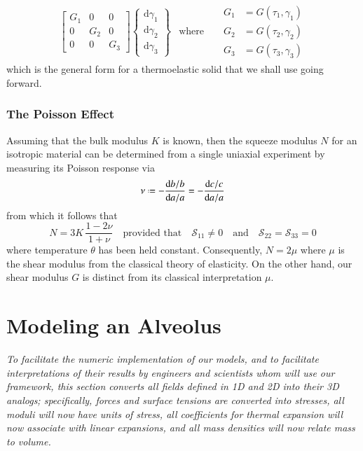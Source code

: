 \begin{subequations}
\begin{align}
\begin{bmatrix}
    G_1 & 0 & 0 \\ 0 & G_2 & 0 \\ 0 & 0 & G_3
    \end{bmatrix} \left\{ \begin{matrix}
    \mathrm{d} \gamma_1 \\ \mathrm{d} \gamma_2 \\ \mathrm{d} \gamma_3
    \end{matrix} \right\} & 
    \text{where} & & \begin{aligned}
    G_1 & = G ( \tau_1 , \gamma_1 ) \\
    G_2 & = G ( \tau_2 , \gamma_2 ) \\
    G_3 & = G ( \tau_3 , \gamma_3 )
    \end{aligned}
    \label{HelmholtzODEsShear}
    \end{align}
\end{subequations}
which is the general form for a thermo\-elastic solid that we shall use going forward.

\subsubsection{The Poisson Effect}

Assuming that the bulk modulus $K$ is known, then the squeeze modulus $N$ for an isotropic material can be determined from a single uniaxial experiment by measuring its Poisson response via
\begin{displaymath}
\nu \defeq - \frac{\mathrm{d}b / b}{\mathrm{d}a / a} = 
- \frac{\mathrm{d} c / c}{\mathrm{d}a / a}
\end{displaymath}
from which it follows that
\begin{displaymath}
N = 3K \, \frac{1 - 2\nu}{1 + \nu}
\quad \text{provided that} \quad
\mathcal{S}_{11} \neq 0 
\quad \text{and} \quad
\mathcal{S}_{22} = \mathcal{S}_{33} = 0 
\end{displaymath}
where temperature $\theta$ has been held constant.  Consequently, $N = 2\mu$ where $\mu$ is the shear modulus from the classical theory of elasticity.  On the other hand, our shear modulus $G$ is distinct from its classical interpretation $\mu$.

\section{Modeling an Alveolus}
\label{secAlveolus}

\textit{To facilitate the numeric implementation of our models, and to facilitate interpretations of their results by engineers and scientists whom will use our framework, this section converts all fields defined in 1D and 2D into their 3D analogs; specifically, forces and surface tensions are converted into stresses, all moduli will now have units of stress, all coefficients for thermal expansion will now associate with linear expansions, and all mass densities will now relate mass to volume.}

